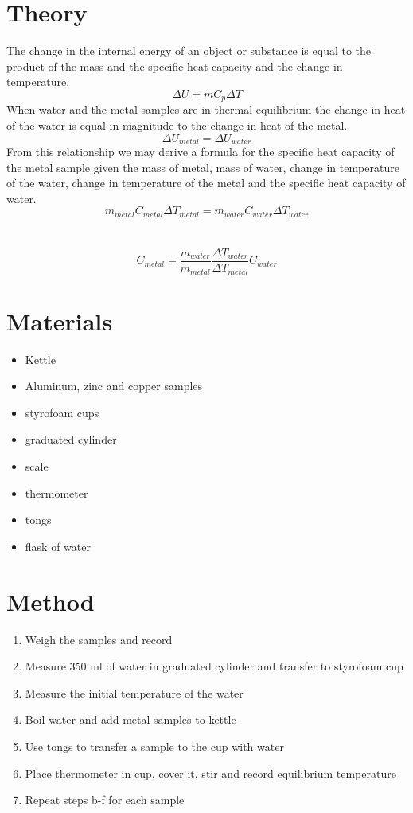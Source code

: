\documentclass{article}
\begin{document}
\section{Theory}
The change in the internal energy of an object or substance is equal to the product of the mass and the specific heat capacity and the change in temperature.
$$\Delta U=mC_p\Delta T$$
When water and the metal samples are in thermal equilibrium the change in heat of the water is equal in magnitude to the change in heat of the metal.
$$\Delta U_{metal}=\Delta U_{water}$$
From this relationship we may derive a formula for the specific heat capacity of the metal sample given the mass of metal, mass of water, change in temperature of the water, change in temperature of the metal and the specific heat capacity of water.
$$m_{metal}C_{metal}\Delta T_{metal}=m_{water}C_{water}\Delta T_{water}$$\\
\\
$$\boxed{C_{metal}=\frac{m_{water}}{m_{metal}}  \frac{\Delta T_{water}}{\Delta T_{metal}}    C_{water}}$$

\newpage

\section{Materials}
\begin{itemize}
\item Kettle 
\item Aluminum, zinc and copper samples
\item styrofoam cups
\item graduated cylinder
\item scale
\item thermometer
\item tongs
\item flask of water
\end{itemize}

\section{Method}

\begin{enumerate}
\item Weigh the samples and record
\item Measure 350 ml of water in graduated cylinder and transfer to styrofoam cup
\item Measure the initial temperature of the water
\item Boil water and add metal samples to kettle
\item Use tongs to transfer a sample to the cup with water
\item Place thermometer in cup, cover it, stir and record equilibrium temperature
\item Repeat steps b-f for each sample

\end{enumerate}
\end{document}
